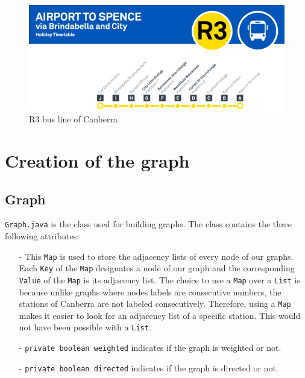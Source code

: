 \documentclass{article}
\begin{document}
\begin{figure}[h]
\begin{center}
	\includegraphics[scale=1]{assets/R3}
\end{center}
\caption{R3 bus line of Canberra}
\end{figure} 

\section{Creation of the graph}

\subsection{Graph}

\texttt{Graph.java} is the class used for building graphs.
The class contains the three following attributes:

\begin{itemize}
\item[-] This \texttt{Map} is used to store the adjacency lists of every node of our graphs. Each \texttt{Key} of the \texttt{Map} designates a node of our graph and the corresponding \texttt{Value} of the \texttt{Map} is its adjacency list. The choice to use a \texttt{Map} over a \texttt{List} is because unlike graphs where nodes labels are consecutive numbers, the stations of Canberra are not labeled consecutively. Therefore, using a \texttt{Map} makes it easier to look for an adjacency list of a specific station. This would not have been possible with a \texttt{List}. 
\item[-]\texttt{private boolean weighted} indicates if the graph is weighted or not.
\item[-]\texttt{private boolean directed} indicates if the graph is directed or not.
\end{itemize}
\end{document}

